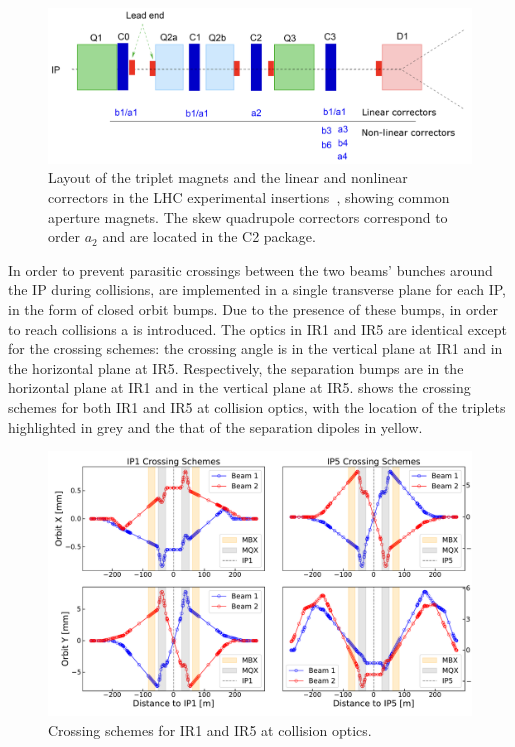 \begin{figure}[!hbt]
  \centering
  \includegraphics*[width=0.92\linewidth]{Figures/Optics_Measurements_Corrections_at_LHC/corrector_package.png}
  \caption{Layout of the triplet magnets and the linear and nonlinear correctors in the LHC experimental insertions~\cite{CERN:Bruning:Dynap_Studies}, showing common aperture magnets. The skew quadrupole correctors correspond to order \(a_2\) and are located in the C\num{2} package.}
  \label{figure:lhc_ir_corrector_layout}
\end{figure}

In order to prevent parasitic crossings between the two beams' bunches around the IP during collisions,  are implemented in a single transverse plane for each IP, in the form of closed orbit bumps.
Due to the presence of these bumps, in order to reach collisions a  is introduced.
The optics in IR\num{1} and IR\num{5} are identical except for the crossing schemes: the crossing angle is in the vertical plane at IR\num{1} and in the horizontal plane at IR\num{5}.
Respectively, the separation bumps are in the horizontal plane at IR\num{1} and in the vertical plane at IR\num{5}.
 shows the crossing schemes for both IR\num{1} and IR\num{5} at collision optics, with the location of the triplets highlighted in grey and the that of the separation dipoles in yellow.

\begin{figure}[!hbt]
  \centering
  \includegraphics*[width=0.99\linewidth]{Figures/Optics_Measurements_Corrections_at_LHC/lhc_crossing_schemes_ip15.pdf}
  \caption{Crossing schemes for IR\num{1} and IR\num{5} at collision optics.}
  \label{figure:lhc_crossing_schemes_ip15}
\end{figure}

